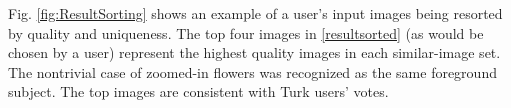 \documentclass{article}
\begin{document}



Fig. \ref{fig:ResultSorting} shows an example of a user's input images being resorted by quality and uniqueness. The top four images in \ref{resultsorted} (as would be chosen by a user) represent the highest quality images in each similar-image set. The nontrivial case of zoomed-in flowers was recognized as the same foreground subject. The top images are consistent with Turk users' votes.

\end{document}
